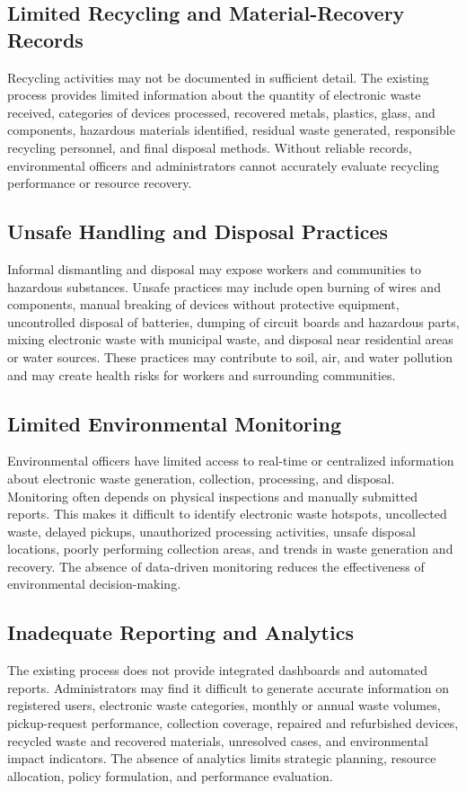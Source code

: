 \subsection{Limited Recycling and Material-Recovery Records}
Recycling activities may not be documented in sufficient detail. The existing
process provides limited information about the quantity of electronic waste
received, categories of devices processed, recovered metals, plastics, glass, and
components, hazardous materials identified, residual waste generated,
responsible recycling personnel, and final disposal methods. Without reliable
records, environmental officers and administrators cannot accurately evaluate
recycling performance or resource recovery.

\subsection{Unsafe Handling and Disposal Practices}
Informal dismantling and disposal may expose workers and communities to
hazardous substances. Unsafe practices may include open burning of wires and
components, manual breaking of devices without protective equipment,
uncontrolled disposal of batteries, dumping of circuit boards and hazardous parts,
mixing electronic waste with municipal waste, and disposal near residential areas
or water sources. These practices may contribute to soil, air, and water pollution
and may create health risks for workers and surrounding communities.

\subsection{Limited Environmental Monitoring}
Environmental officers have limited access to real-time or centralized information
about electronic waste generation, collection, processing, and disposal.
Monitoring often depends on physical inspections and manually submitted
reports. This makes it difficult to identify electronic waste hotspots, uncollected
waste, delayed pickups, unauthorized processing activities, unsafe disposal
locations, poorly performing collection areas, and trends in waste generation and
recovery. The absence of data-driven monitoring reduces the effectiveness of
environmental decision-making.

\subsection{Inadequate Reporting and Analytics}
The existing process does not provide integrated dashboards and automated
reports. Administrators may find it difficult to generate accurate information on
registered users, electronic waste categories, monthly or annual waste volumes,
pickup-request performance, collection coverage, repaired and refurbished
devices, recycled waste and recovered materials, unresolved cases, and
environmental impact indicators. The absence of analytics limits strategic
planning, resource allocation, policy formulation, and performance evaluation.

